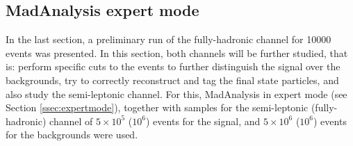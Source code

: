 \begin{comment}
\subsubsection{Signal over background histograms}

Finally, from this preliminary analysis, a series of histograms where the signal is bigger than the backgrounds were obtained. These histograms are very useful, as from them, one can determine the selection criteria necessary to separate signals from backgrounds.

\begin{figure}[ht!]
     \begin{center}
        \subfigure[$\bm{p}_T$ of $j_1$.]{
            \label{soverb1}
            \texttt{[image: Sections/images/Signal/señal1.png]}
        }
        \subfigure[$\Delta R$ between $j_1$ and $j_2$.]{
            \label{soverb2}
            \texttt{[image: Sections/images/Signal/señal2.png]}
        }\\
        \subfigure[$\bm{p}_T$ of $b_1$.]{
            \label{soverb3}
            \texttt{[image: Sections/images/Signal/señal3.png]}
        }
        \subfigure[$\Delta\bm{p}_T$ between $b_1$ and $b_2$.]{
            \label{soverb4}
            \texttt{[image: Sections/images/Signal/señal4.png]}
        }
    \end{center}
    \caption{Histogram with higher signal over background results for different topological and kinematic variables.} 
    \label{soverb}
\end{figure}
\end{comment}

\subsection{MadAnalysis expert mode} \label{ssec:resultsexpertmode}

In the last section, a preliminary run of the fully-hadronic channel for 10000 events was presented. In this section, both channels will be further studied, that is: perform specific cuts to the events to further distinguish the signal over the backgrounds, try to correctly reconstruct and tag the final state particles, and also study the semi-leptonic channel. For this, MadAnalysis in expert mode (see Section \ref{ssec:expertmode}), together with samples for the semi-leptonic (fully-hadronic) channel of $5\times10^5$ ($10^6$) events for the signal, and $5\times10^6$ ($10^6$) events for the backgrounds were used.

